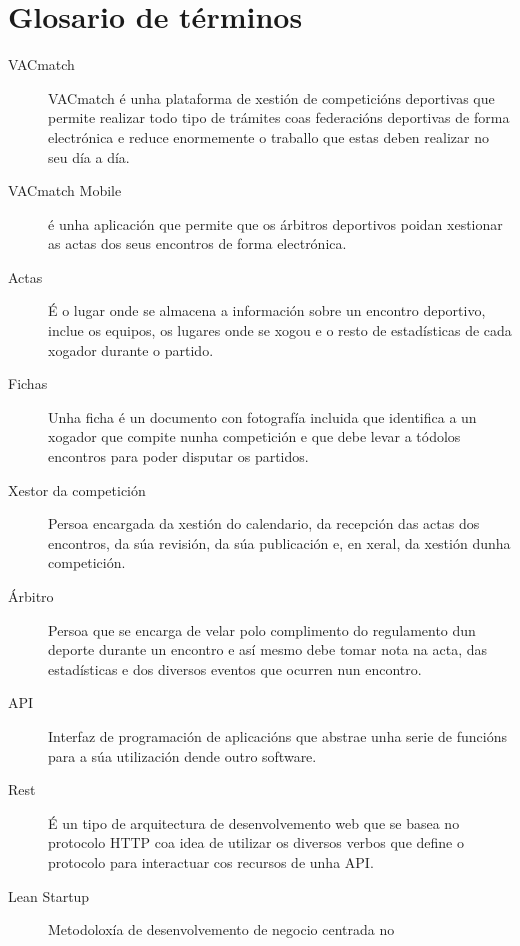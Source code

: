 \chapter{Glosario de términos}
\label{chap:glosario-terminos}


\begin{description}
  \item [VACmatch] VACmatch é unha plataforma de xestión de competicións deportivas que 
permite realizar todo tipo de trámites coas federacións deportivas de forma electrónica e 
reduce enormemente o traballo que estas deben realizar no seu día a día.
  \item [VACmatch Mobile] é unha aplicación que permite que os árbitros deportivos 
poidan xestionar as actas dos seus encontros de forma electrónica.
  \item [Actas] É o lugar onde se almacena a información sobre un encontro 
deportivo, inclue os equipos, os lugares onde se xogou e o resto de estadísticas de cada 
xogador durante o partido.
  \item [Fichas] Unha ficha é un documento con fotografía incluida que identifica a un 
xogador que compite nunha competición e que debe levar a tódolos encontros para poder 
disputar os partidos.
  \item [Xestor da competición] Persoa encargada da xestión do calendario, da recepción 
das actas dos encontros, da súa revisión, da súa publicación e, en xeral, da xestión dunha 
competición.
  \item [Árbitro] Persoa que se encarga de velar polo complimento do regulamento dun 
deporte durante un encontro e así mesmo debe tomar nota na acta, das estadísticas e dos 
diversos eventos que ocurren nun encontro.
 \item [API] Interfaz de programación de aplicacións que abstrae unha serie de 
funcións para a súa utilización dende outro software.
 \item [Rest] É un tipo de arquitectura de desenvolvemento web que se basea 
no protocolo HTTP coa idea de utilizar os diversos verbos que define o 
protocolo para interactuar cos recursos de unha API.
 \item [Lean Startup] Metodoloxía de desenvolvemento de negocio centrada no 

\end{description}
